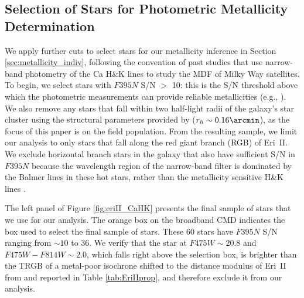 \documentclass[twocolumn]{aastex63}
\begin{document}
\subsection{Selection of Stars for Photometric Metallicity Determination} 

\par We apply further cuts to select stars for our metallicity inference in Section \ref{sec:metallicity_indiv}, following the convention of past studies that use narrow-band photometry of the Ca H\&K lines to study the MDF of Milky Way satellites. To begin, we select stars with $F395N$ S/N $>$ 10: this is the S/N threshold above which the photometric measurements can provide reliable metallicities (e.g., \citealt{longeard2018dracoII}). We also remove any stars that fall within two half-light radii of the galaxy's star cluster using the structural parameters provided by \citealt{simon2021EriII} ($r_h \sim 0.16\arcmin$), as the focus of this paper is on the field population. From the resulting sample, we limit our analysis to only stars that fall along the red giant branch (RGB) of Eri~II. We exclude horizontal branch stars in the galaxy that also have sufficient S/N in $F395N$ because the wavelength region of the narrow-band filter is dominated by the Balmer lines in these hot stars, rather than the metallicity sensitive H\&K lines \citep[e.g., ][]{starkenburg2017pristine}.

\par The left panel of Figure \ref{fig:eriII_CaHK} presents the final sample of stars that we use for our analysis. The orange box on the broadband CMD indicates the box used to select the final sample of stars. These 60 stars have $F395N$ S/N ranging from $\sim10$ to 36. We verify that the star at $F475W\sim20.8$ and $F475W-F814W\sim2.0$, which falls right above the selection box, is brighter than the TRGB of a metal-poor isochrone shifted to the distance modulus of Eri~II from \citet{crnojevic2016eriII} and reported in Table \ref{tab:EriIIprop}, and therefore exclude it from our analysis.
\end{document}
